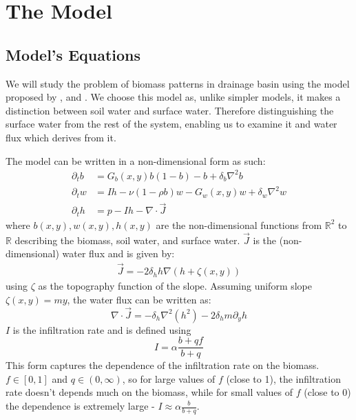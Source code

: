 \documentclass{article}
\numberwithin{equation}{section}
\begin{document}
\section{The Model}
\subsection{Model's Equations}
We will study the problem of biomass patterns in drainage basin using the model proposed by \cite{gilad_phys_2004}, and \cite{gilad_mathematical_2007}. We choose this model as, unlike simpler models, it makes a distinction between soil water and surface water. Therefore distinguishing the surface water from the rest of the system, enabling us to examine it and water flux which derives from it.

The model can be written in a non-dimensional form as such:
\begin{align}
    \partial_t b & = G_b(x,y) b(1-b) - b + \delta_b\nabla^2 b              \\
    \partial_t w & = Ih - \nu(1-\rho b)w - G_w(x,y)w + \delta_w \nabla^2 w \\
    \partial_t h & = p - Ih - \nabla \cdot \vec{J}
\end{align}
where $b(x,y),w(x,y),h(x,y)$ are the non-dimensional functions from $\mathbb{R}^2$ to $\mathbb{R}$ describing the biomass, soil water, and surface water. $\vec{J}$ is the (non-dimensional) water flux and is given by:
\begin{align}
    \label{eq:flux_def}
    \vec{J} =  -2\delta_h h\nabla\left(h+\zeta(x,y)\right)
\end{align}
using $\zeta$ as the topography function of the slope. Assuming uniform slope $\zeta(x,y)=my\label{eq:terrain}$, the water flux can be written as:
\begin{equation}
    \nabla \cdot \vec{J} = -\delta_h \nabla^2(h^2) - 2\delta_h m \partial_y h
\end{equation}
$I$ is the infiltration rate and is defined using
\begin{equation}
    I = \alpha \frac{b+qf}{b+q}
\end{equation}
This form captures the dependence of the infiltration rate on the biomass. $f\in[0,1]$ and $q\in(0,\infty)$, so for large values of $f$ (close to 1), the infiltration rate doesn't depends much on the biomass, while for small values of $f$ (close to 0) the dependence is extremely large - $I\approx \alpha\frac{b}{b+q}$.
\end{document}
